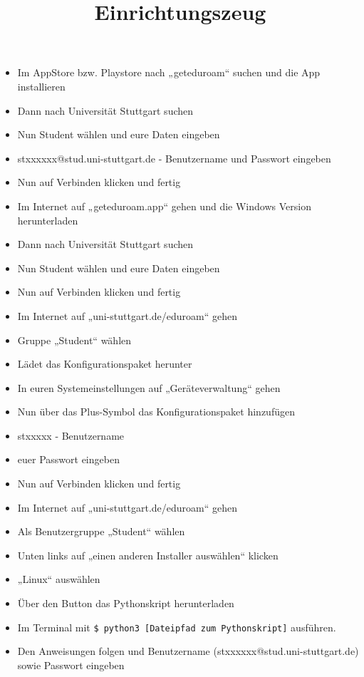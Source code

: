 \documentclass{../sheet}
\title{Einrichtungszeug}
\begin{document}
\maketitle

\begin{itemize}
    \item Im AppStore bzw. Playstore nach „geteduroam“ suchen und die App installieren
    \item Dann nach Universität Stuttgart suchen
    \item Nun Student wählen und eure Daten eingeben
    \item stxxxxxx@stud.uni-stuttgart.de - Benutzername und Passwort eingeben
    \item Nun auf Verbinden klicken und fertig
\end{itemize}

\begin{itemize}
    \item Im Internet auf „geteduroam.app“ gehen und die Windows Version herunterladen
    \item Dann nach Universität Stuttgart suchen
    \item Nun Student wählen und eure Daten eingeben
    \item Nun auf Verbinden klicken und fertig
\end{itemize}

    \begin{itemize}
        \item Im Internet auf „uni-stuttgart.de/eduroam“ gehen
        \item Gruppe „Student“ wählen
        \item Lädet das Konfigurationspaket herunter
        \item In euren Systemeinstellungen auf „Geräteverwaltung“ gehen
        \item Nun über das Plus-Symbol das Konfigurationspaket hinzufügen
        \item stxxxxx - Benutzername
        \item euer Passwort eingeben
        \item Nun auf Verbinden klicken und fertig
    \end{itemize}
\newpage
{}
\begin{itemize}
    \item Im Internet auf „uni-stuttgart.de/eduroam“ gehen
    \item Als Benutzergruppe „Student“ wählen
    \item Unten links auf „einen anderen Installer auswählen“ klicken
    \item „Linux“ auswählen
    \item Über den Button das Pythonskript herunterladen
    \item Im Terminal mit \texttt{\$ python3 [Dateipfad zum Pythonskript]} ausführen.
    \item Den Anweisungen folgen und Benutzername (stxxxxxx@stud.uni-stuttgart.de) sowie Passwort eingeben
\end{itemize}
\end{document}

